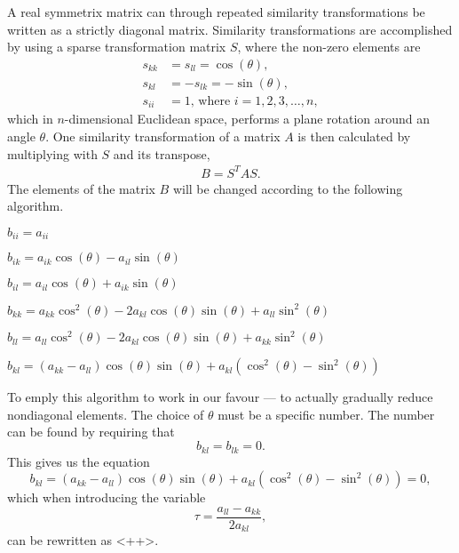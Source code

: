 A real symmetrix matrix can through repeated similarity
transformations be written as a strictly diagonal matrix.
Similarity transformations are accomplished by using a sparse
transformation matrix $S$, where the non-zero elements are
\begin{align*}
    s_{kk} &= s_{ll} = \cos{(\theta)}, \\
    s_{kl} &= -s_{lk} = -\sin{(\theta)}, \\
    s_{ii} &= 1 \text{, where } i = 1,2,3,\dots,n,
\end{align*}
which in $n$-dimensional Euclidean space, performs a plane rotation
around an angle $\theta$. One similarity transformation of a matrix
$A$ is then calculated by multiplying with $S$ and its transpose,
\begin{align*}
    B = S^T A S.
\end{align*}
The elements of the matrix $B$ will be changed according to the
following algorithm.
\begin{algorithmic}
        \State$b_{ii} = a_{ii}$

        \State $b_{ik} = a_{ik}\cos{(\theta)} - a_{il}\sin{(\theta)}$

        \State $b_{il} = a_{il}\cos{(\theta)} + a_{ik}\sin{(\theta)}$

        \State $b_{kk} = a_{kk}\cos^2{(\theta)} -
        2a_{kl}\cos{(\theta)}\sin{(\theta)} +
        a_{ll}\sin^2{(\theta)}$

        \State $b_{ll} = a_{ll}\cos^2{(\theta)} -
        2a_{kl}\cos{(\theta)}\sin{(\theta)} +
        a_{kk}\sin^2{(\theta)}$
        
        \State $b_{kl} =
        (a_{kk}-a_{ll})\cos{(\theta)}\sin{(\theta)} +
        a_{kl}(\cos^2{(\theta)} - \sin^2{(\theta)})$
    \EndFor
\end{algorithmic}
To emply this algorithm to work in our favour --- to actually
gradually reduce nondiagonal elements. The choice of $\theta$ must
be a specific number. The number can be found by requiring that
\[b_{kl} = b_{lk} = 0.\] This gives us the equation
\[b_{kl} = (a_{kk} - a_{ll})\cos{(\theta)}\sin{(\theta)} +
a_{kl}(\cos^2{(\theta)} - \sin^2{(\theta)}) = 0,\] which when
introducing the variable \[\tau =
\frac{a_{ll}-a_{kk}}{2a_{kl}},\] can be rewritten as <++>.
